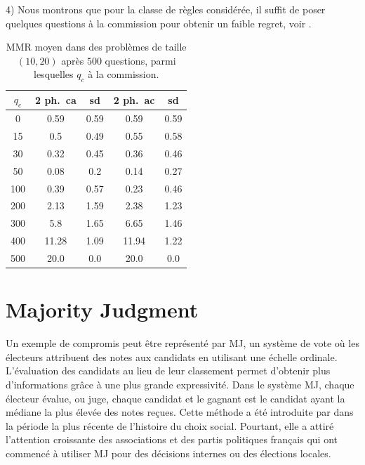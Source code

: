 	
	4) Nous montrons que pour la classe de règles considérée, il suffit de poser quelques questions à la commission pour obtenir un faible regret, voir .
		\begin{table}
			\centering
			\captionsetup{type=table}
			\caption{MMR moyen dans des problèmes de taille $(10, 20)$ après $500$ questions, parmi lesquelles $q_c$ à la commission.}
			\label{tab:twoP500French}
			\begin{tabular}{S[table-figures-integer=3, table-figures-decimal=0]S[table-number-alignment = right]@{ ± }S[table-number-alignment = left, table-figures-integer=1]S[table-number-alignment = right]@{ ± }S[table-number-alignment = left, table-figures-integer=1]}
				\toprule
				{$q_c$} & {2 ph.\ ca} & {sd} & {2 ph.\ ac} & {sd} \\
				\midrule		
				
				0	&	0.59	&	0.59	&	0.59	&	0.59	\\
				15	&	0.5		&	0.49	&	0.55	&	0.58	\\
				30	&	0.32	&	0.45	&	0.36	&	0.46	\\
				50	&	0.08	&	0.2 	&	0.14	&	0.27	\\
				100	&	0.39	&	0.57	&	0.23	&	0.46	\\
				200	&	2.13	&	1.59	&	2.38	&	1.23	\\
				300	&	5.8 	&	1.65	&	6.65	&	1.46	\\
				400	&	11.28	&	1.09	&	11.94	&	1.22	\\
				500	&	20.0	&	0.0	&	20.0	&	0.0	\\
				
				\bottomrule
			\end{tabular}
		\end{table}
	


\section{Majority Judgment}
	Un exemple de compromis peut être représenté par \acl{MJ}, un système de vote où les électeurs attribuent des notes aux candidats en utilisant une échelle ordinale. L'évaluation des candidats au lieu de leur classement permet d'obtenir plus d'informations grâce à une plus grande expressivité.
	Dans le système \ac{MJ}, chaque électeur évalue, ou juge, chaque candidat et le gagnant est le candidat ayant la médiane la plus élevée des notes reçues. 
	Cette méthode a été introduite par \citet{Balinski2007} dans la période la plus récente de l'histoire du choix social. Pourtant, elle a attiré l'attention croissante des associations et des partis politiques français qui ont commencé à utiliser \ac{MJ} pour des décisions internes ou des élections locales. 
	
